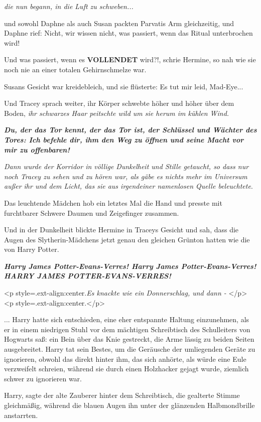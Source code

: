 \emph{die nun begann, in die Luft zu schweben...}

und sowohl Daphne als auch Susan packten Parvatis Arm gleichzeitig, und Daphne
rief: \glqq Nicht, wir wissen nicht, was passiert, wenn das Ritual unterbrochen
wird!\grqq{}

\glqq Und was passiert, wenn es \textbf{VOLLENDET} wird?!\grqq{}, schrie
Hermine, so nah wie sie noch nie an einer totalen Gehirnschmelze war.

Susans Gesicht war kreidebleich, und sie flüsterte: \glqq Es tut mir leid,
Mad-Eye...\grqq{}

Und Tracey sprach weiter, ihr Körper schwebte höher und höher über dem
Boden,\emph{ ihr schwarzes Haar peitschte wild um sie herum im kühlen Wind.}

\glqq \textbf{\emph{Du, der das Tor kennt, der das Tor ist, der Schlüssel und
Wächter des Tores: Ich befehle dir, ihm den Weg zu öffnen und seine Macht vor
mir zu offenbaren!}}\grqq{}

\emph{Dann wurde der Korridor in völlige Dunkelheit und Stille getaucht, so dass
nur noch Tracey zu sehen und zu hören war, als gäbe es nichts mehr im Universum
außer ihr und dem Licht, das sie aus irgendeiner namenlosen Quelle beleuchtete}.

Das leuchtende Mädchen hob ein letztes Mal die Hand und presste mit furchtbarer
Schwere Daumen und Zeigefinger zusammen.

Und in der Dunkelheit blickte Hermine in Traceys Gesicht und sah, dass die Augen
des Slytherin-Mädchens jetzt genau den gleichen Grünton hatten wie die von Harry
Potter.

\glqq \textbf{\emph{Harry James Potter-Evans-Verres! Harry James
Potter-Evans-Verres! HARRY JAMES POTTER-EVANS-VERRES!}}\grqq{}

<p style=\grqq{}.ext-align:center\grqq{}.\emph{Es knackte wie ein Donnerschlag,
und dann - }</p> <p style=\grqq{}.ext-align:center\grqq{}.</p>

... Harry hatte sich entschieden, eine eher entspannte Haltung einzunehmen, als
er in einem niedrigen Stuhl vor dem mächtigen Schreibtisch des Schulleiters von
Hogwarts saß: ein Bein über das Knie gestreckt, die Arme lässig zu beiden Seiten
ausgebreitet. Harry tat sein Bestes, um die Geräusche der umliegenden Geräte zu
ignorieren, obwohl das direkt hinter ihm, das sich anhörte, als würde eine Eule
verzweifelt schreien, während sie durch einen Holzhacker gejagt wurde, ziemlich
schwer zu ignorieren war.

\glqq Harry\grqq{}, sagte der alte Zauberer hinter dem Schreibtisch, die
gealterte Stimme gleichmäßig, während die blauen Augen ihn unter der glänzenden
Halbmondbrille anstarrten.

